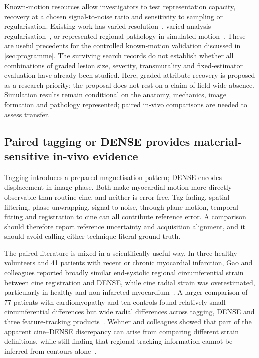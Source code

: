Known-motion resources allow investigators to test representation capacity, recovery at a chosen signal-to-noise ratio and sensitivity to sampling or regularisation. Existing work has varied resolution~\cite{adams2023}, varied analysis regularisation~\cite{barbaroux2025}, or represented regional pathology in simulated motion~\cite{mrxcat2023,zhou2018straus}. These are useful precedents for the controlled known-motion validation discussed in \cref{sec:programme}. The surviving search records do not establish whether all combinations of graded lesion size, severity, transmurality and fixed-estimator evaluation have already been studied. Here, graded attribute recovery is proposed as a research priority; the proposal does not rest on a claim of field-wide absence. Simulation results remain conditional on the anatomy, mechanics, image formation and pathology represented; paired in-vivo comparisons are needed to assess transfer.

\subsection{Paired tagging or DENSE provides material-sensitive in-vivo evidence}\label{sec:paired}

Tagging introduces a prepared magnetisation pattern; DENSE encodes displacement in image phase. Both make myocardial motion more directly observable than routine cine, and neither is error-free. Tag fading, spatial filtering, phase unwrapping, signal-to-noise, through-plane motion, temporal fitting and registration to cine can all contribute reference error. A comparison should therefore report reference uncertainty and acquisition alignment, and it should avoid calling either technique literal ground truth.

The paired literature is mixed in a scientifically useful way. In three healthy volunteers and 41 patients with recent or chronic myocardial infarction, Gao and colleagues reported broadly similar end-systolic regional circumferential strain between cine registration and DENSE, while cine radial strain was overestimated, particularly in healthy and non-infarcted myocardium~\cite{gao2014cine}. A larger comparison of 77 patients with cardiomyopathy and ten controls found relatively small circumferential differences but wide radial differences across tagging, DENSE and three feature-tracking products~\cite{cao2018}. Wehner and colleagues showed that part of the apparent cine--DENSE discrepancy can arise from comparing different strain definitions, while still finding that regional tracking information cannot be inferred from contours alone~\cite{wehner2018}.

